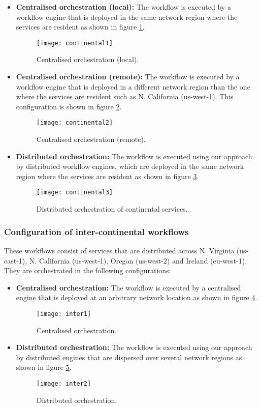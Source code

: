 \documentclass[10pt, conference, compsocconf]{IEEEtran}
\begin{document}
\begin{itemize}
\item \textbf{Centralised orchestration (local):}
The workflow is executed by a workflow engine that is deployed in the same network region where the services are resident as shown in figure \ref{regionallocal}.
\begin{figure}[h]
\centerline{\texttt{[image: continental1]}}
\caption{Centralised orchestration (local).}
\label{regionallocal}
\end{figure}
\item \textbf{Centralised orchestration (remote):}
The workflow is executed by a workflow engine that is deployed in a different network region than the one where the services are resident such as N. California (us-west-1).
This configuration is shown in figure \ref{regionalremote}.
\begin{figure}[h]
\centerline{\texttt{[image: continental2]}}
\caption{Centralised orchestration (remote).}
\label{regionalremote}
\end{figure}
\item \textbf{Distributed orchestration:}
The workflow is executed using our approach by distributed workflow engines, which are deployed in the same network region where the services are resident as shown in figure \ref{regionaldistributed}.
\begin{figure}[h]
\centerline{\texttt{[image: continental3]}}
\caption{Distributed orchestration of continental services.}
\label{regionaldistributed}
\end{figure}
\end{itemize}

\subsubsection{Configuration of inter-continental workflows}
These workflows consist of services that are distributed across N. Virginia (us-east-1), N. California (us-west-1), Oregon (us-west-2) and Ireland (eu-west-1).
They are orchestrated in the following configurations:
\begin{itemize}
\item \textbf{Centralised orchestration:}
The workflow is executed by a centralised engine that is deployed at an arbitrary network location as shown in figure \ref{continentalcentralised}.
\begin{figure}[h]
\centerline{\texttt{[image: inter1]}}
\caption{Centralised orchestration.}
\label{continentalcentralised}
\end{figure}
\item \textbf{Distributed orchestration:}
The workflow is executed using our approach by distributed engines that are dispersed over several network regions as shown in figure \ref{continentaldistributed}.

\begin{figure}[h]
\centerline{\texttt{[image: inter2]}}
\caption{Distributed orchestration.}
\label{continentaldistributed}
\end{figure}
\end{itemize}
\end{document}
